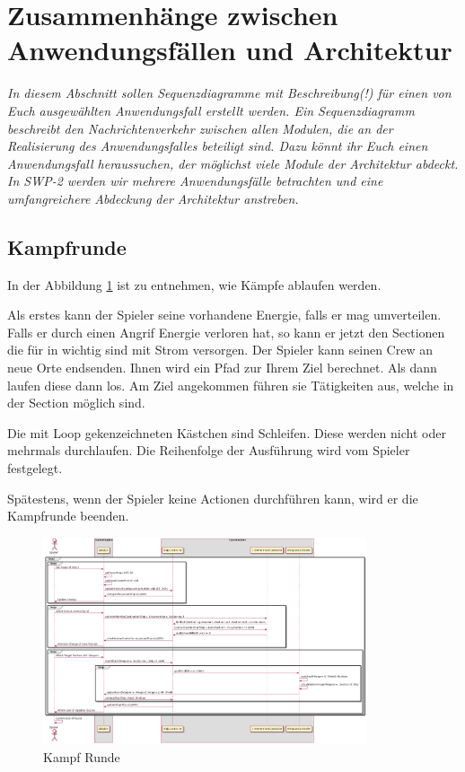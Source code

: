 \documentclass[fontsize=12pt,paper=a4,twoside]{scrartcl}
\begin{document}
\section{Zusammenhänge zwischen Anwendungsfällen und Architektur}
 \label{sec:anwendungsfaelle}

{\itshape In diesem Abschnitt sollen Sequenzdiagramme mit Beschreibung(!) für 
%
{einen von Euch ausgewählten Anwendungsfall}
erstellt werden. Ein Sequenzdiagramm beschreibt den Nachrichtenverkehr zwischen 
allen Modulen, die an der Realisierung des Anwendungsfalles beteiligt sind. 
%
{Dazu könnt ihr Euch einen Anwendungsfall heraussuchen, der möglichst viele 
Module der  Architektur abdeckt. In SWP-2 werden wir mehrere Anwendungsfälle
betrachten und eine umfangreichere Abdeckung der Architektur anstreben.} }


\subsection{Kampfrunde}

In der Abbildung \ref{fig:Kampf} ist zu entnehmen, wie Kämpfe ablaufen werden.


Als erstes kann der Spieler seine vorhandene Energie, falls er mag umverteilen.
Falls er durch einen Angrif Energie verloren hat, so kann er jetzt den Sectionen
die für in wichtig sind mit Strom versorgen.
Der Spieler kann seinen Crew an neue Orte endsenden. Ihnen wird ein Pfad zur Ihrem Ziel
berechnet. Als dann laufen diese dann los. Am Ziel angekommen führen sie Tätigkeiten aus, welche in der Section möglich sind.

Die mit Loop gekenzeichneten Kästchen sind Schleifen. Diese werden nicht oder mehrmals durchlaufen. Die Reihenfolge der Ausführung wird vom Spieler festgelegt.

Spätestens, wenn der Spieler keine Actionen durchführen kann, wird er die Kampfrunde beenden.


\begin{figure}[!ht]
	\centering
  \includegraphics[width=0.85\textwidth]{pics/kampf}
	\caption{Kampf Runde}
	\label{fig:Kampf}
\end{figure}
\end{document}
